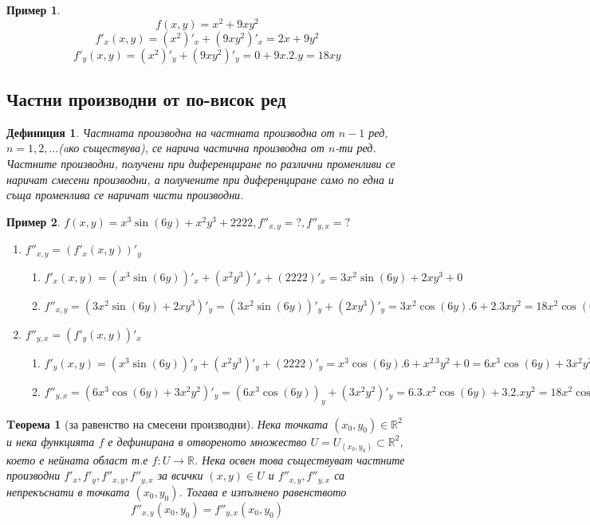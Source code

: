 \documentclass[fleqn,12pt]{article}
\newtheorem{theorem}{Tеорема}[subsection]
\newtheorem{example}{Пример}[subsection]
\newtheorem{definition}{Дефиниция}[subsection]
\begin{document}
\begin{example}
$$f(x,y) = x^2 + 9xy^2$$
$$f'_x (x,y) = (x^2)'_x+(9xy^2)'_x = 2x + 9y^2$$
$$f'_y (x,y) = (x^2)'_y+(9xy^2)'_y = 0 + 9x.2.y = 18xy $$
\end{example}

\subsection{Частни производни от по-висок ред}

\begin{definition}
Частната производна на частната производна от $n-1$ ред, $n = 1, 2, ...$(aко съществува), се нарича частична производна от $n$-ти ред. Частните производни, получени при диференциране по различни променливи се наричат смесени производни, а получените при диференциране само по една и съща променлива се наричат чисти производни. 
\end{definition}

\begin{example}
$f(x,y) = x^3\sin(6y) + x^2y^3 + 2222, f''_{x,y} = ?, f''_{y,x} = ?$
	\begin{enumerate}
	\item $f''_{x,y} = (f'_x(x,y))'_y$\\
		\begin{enumerate}
			\item$f'_x(x,y) =(x^3\sin(6y))'_x + (x^2y^3)'_x + (2222)'_x = 3x^2 \sin(6y) + 2xy^3 + 0 $
			\item$f''_{x,y} = (3x^2 \sin(6y) + 2xy^3)'_y = (3x^2 \sin(6y))'_y + (2xy^3)'_y  =3x^2 \cos(6y).6 + 2.3xy^2 = 18x^2\cos(6y) + 6xy^2$
		\end{enumerate}
	\item $f''_{y,x} = (f'_y(x,y))'_x$
		\begin{enumerate}
			\item $f'_y (x,y) =(x^3\sin(6y))'_y + (x^2y^3)'_y + (2222)'_y = x^3 \cos(6y).6 + x^2.3y^2 + 0 = 6x^3 \cos(6y) + 3x^2y^2 $ 
			\item $f''_{y,x} = (6x^3 \cos(6y) + 3x^2y^2)'_y = (6x^3 \cos(6y))_y + (3x^2y^2)'_y = 6.3.x^2 \cos(6y) + 3.2.xy^2 = 18x^2\cos(6y) + 6xy^2 $
		\end{enumerate}
	\end{enumerate}
\end{example}

\begin{theorem}[за равенство на смесени производни]
Нека точката $(x_0, y_0) \in \mathbb{R}^2$ и нека функцията $f$ е дефинирана в отвореното множество $U=U_{(x_0, y_0)} \subset \mathbb{R}^2$, което е нейната област т.е $f: U \to \mathbb{R}$. Нека освен това съществуват частните производни $f'_x, f'_y,f''_{x,y},f''_{y,x}$ за всички $(x, y)\in U$ и $f''_{x,y},f''_{y,x}$ са непрекъснати в точката $(x_0, y_0)$. Тогава е изпълнено равенството 
$$f''_{x,y}(x_0, y_0) = f''_{y,x}(x_0, y_0)$$
\end{theorem}
\end{document}
